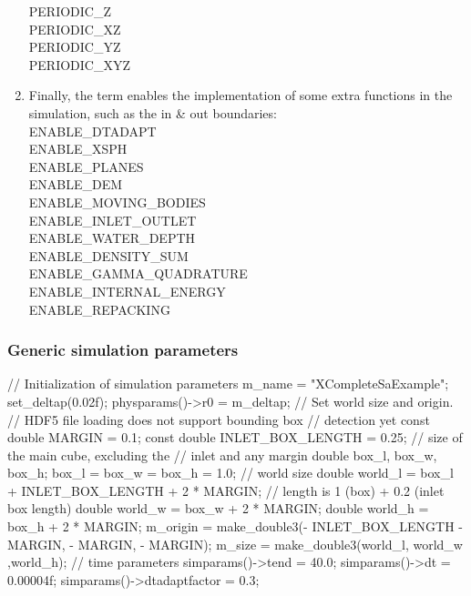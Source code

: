 \documentclass{../GPUSPHtemplate}
\begin{document}
\begin{enumerate}
  PERIODIC_Z \\
  PERIODIC_XZ \\
  PERIODIC_YZ \\
  PERIODIC_XYZ \\
\item Finally, the  term enables the implementation 
of some extra functions in the simulation, such as the in \& out boundaries:\\
ENABLE\_DTADAPT \\
ENABLE\_XSPH \\
ENABLE\_PLANES \\
ENABLE\_DEM \\
ENABLE\_MOVING\_BODIES \\
ENABLE\_INLET\_OUTLET \\
ENABLE\_WATER\_DEPTH \\
ENABLE\_DENSITY\_SUM \\
ENABLE\_GAMMA\_QUADRATURE \\
ENABLE\_INTERNAL\_ENERGY\\
ENABLE\_REPACKING \\
\end{enumerate}

\subsubsection{Generic simulation parameters}

\begin{ccode}
// Initialization of simulation parameters
m_name = "XCompleteSaExample";
set_deltap(0.02f);
physparams()->r0 = m_deltap;
// Set world size and origin.
// HDF5 file loading does not support bounding box 
// detection yet
const double MARGIN = 0.1;
const double INLET_BOX_LENGTH = 0.25;
// size of the main cube, excluding the 
// inlet and any margin
double box_l, box_w, box_h;
box_l = box_w = box_h = 1.0;
// world size
double world_l = box_l + INLET_BOX_LENGTH 
    + 2 * MARGIN; // length is 1 (box) + 0.2 (inlet box length)
double world_w = box_w + 2 * MARGIN;
double world_h = box_h + 2 * MARGIN;
m_origin = make_double3(- INLET_BOX_LENGTH - MARGIN,
    - MARGIN, - MARGIN);
m_size = make_double3(world_l, world_w ,world_h);
// time parameters
simparams()->tend = 40.0;
simparams()->dt = 0.00004f;
simparams()->dtadaptfactor = 0.3;
\end{ccode}
\end{document}
